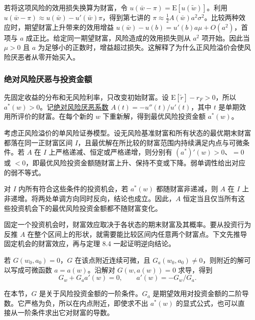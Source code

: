 若将这项风险的效用损失换算为财富，令 $u(\bar w-\pi)=\mathrm E[u(\tilde w)]$。利用 $u(\bar w-\pi)\approx u(\bar w)-u'(\bar w)\pi$，得到第七讲的
$\pi\approx \tfrac12 A(\bar w)a^2\sigma^2$。比较两种效应时，期望财富上升带来的效用增益 $u(\bar w)-u(b)=u'(b)a\mu+O(a^2)$，首项与 $a$ 成正比。给定同一期望财富，风险造成的效用损失则从 $a^2$ 项开始。因此当 $\mu>0$ 且 $a$ 为足够小的正数时，增益超过损失。这解释了为什么正风险溢价会使风险厌恶者从零开始买入。

\subsubsection{绝对风险厌恶与投资金额}
先固定收益的分布和无风险利率，只改变初始财富。设 $\mathrm E[\tilde r]-r_F>0$，所以 $a^*(w)>0$。记\hyperlink{wj-absolute-risk-aversion}{\textcolor{WJReferenceColor}{绝对风险厌恶系数}}
$A(t)=-u''(t)/u'(t)$，其中 $t$ 是单期效用所评价的财富。在每个新的 $w$ 下重新解，得到最优风险投资金额 $a^*(w)$。
\begin{tcolorbox}[knowledge]
 考虑正风险溢价的单风险证券模型。设无风险基准财富和所有状态的最优期末财富都落在同一正财富区间 $I$，且最优解在所比较的财富范围内持续满足内点与可微条件。若 $A$ 在 $I$ 上严格递减、恒定或严格递增，则分别有 $(a^*)'(w)>0$、$=0$ 或 $<0$，即最优风险投资金额随财富上升、保持不变或下降。弱单调性给出对应的弱不等式。

对 $I$ 内所有符合这些条件的投资机会，若 $a^*(w)$ 都随财富非递减，则 $A$ 在 $I$ 上非递增。将两处单调方向同时反向，结论也成立。因此，$A$ 恒定当且仅当所有这些投资机会下的最优风险投资金额都不随财富变化。
\end{tcolorbox}

固定一个投资机会时，财富效应取决于各状态的期末财富及其概率。要从投资行为反推 $A$ 在整个区间上的形状，就需要能比较区间内任意两个财富点。下文先推导固定机会的财富效应，再与定理 8.4 一起证明逆向结论。

\begin{tcolorbox}[knowledge,title=隐函数定理与最优头寸]
若 $G(w_0,a_0)=0$，$G$ 在该点附近连续可微，且 $G_a(w_0,a_0)\ne0$，则附近的解可以写成可微函数 $a=a(w)$。沿解对 $G(w,a(w))=0$ 求导，得到
\[
 G_w+G_a a'(w)=0,\qquad a'(w)=-G_w/G_a.
\]

在本节，$G$ 是关于风险投资金额的一阶条件。$G_a$ 是期望效用对投资金额的二阶导数。它严格为负，所以在内点附近，即使求不出 $a^*(w)$ 的显式公式，也可以直接从一阶条件求出它对财富的导数。
\end{tcolorbox}

